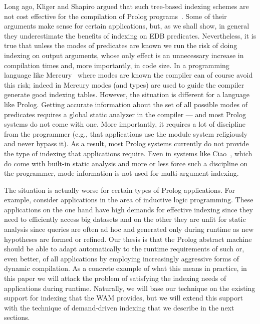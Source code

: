 \documentclass{llncs}
\newcommand{\JITI}{demand-driven indexing\xspace}
\begin{document}
Long ago, Kliger and Shapiro argued that such tree-based indexing
schemes are not cost effective for the compilation of Prolog
programs~\cite{KligerShapiro@ICLP-88}. Some of their arguments make
sense for certain applications, but, as we shall show, in general 
they underestimate the benefits of indexing on EDB predicates.
Nevertheless, it is true that unless the modes of
predicates are known we run the risk of doing indexing on output
arguments, whose only effect is an unnecessary increase in compilation
times and, more importantly, in code size. In a programming language
like Mercury~\cite{Mercury@JLP-96} where modes are known the compiler
can of course avoid this risk; indeed in Mercury modes (and types) are
used to guide the compiler generate good indexing tables. However, the
situation is different for a language like Prolog. Getting accurate
information about the set of all possible modes of predicates requires
a global static analyzer in the compiler --- and most Prolog systems
do not come with one. More importantly, it requires a lot of
discipline from the programmer (e.g., that applications use the module
system religiously and never bypass it). As a result, most Prolog
systems currently do not provide the type of indexing that
applications require. Even in systems like Ciao~\cite{Ciao@SCP-05},
which do come with built-in static analysis and more or less force
such a discipline on the programmer, mode information is not used for
multi-argument indexing.

The situation is actually worse for certain types of Prolog
applications. For example, consider applications in the area of
inductive logic programming. These applications on the one hand have
high demands for effective indexing since they need to efficiently
access big datasets and on the other they are unfit for static
analysis since queries are often ad hoc and generated only during
runtime as new hypotheses are formed or refined.
%
Our thesis is that the Prolog abstract machine should be able to adapt
automatically to the runtime requirements of such or, even better, of
all applications by employing increasingly aggressive forms of dynamic
compilation. As a concrete example of what this means in practice, in
this paper we will attack the problem of satisfying the indexing needs
of applications during runtime. Naturally, we will base our technique
on the existing support for indexing that the WAM provides, but we
will extend this support with the technique of \JITI that we describe
in the next sections.
\end{document}
